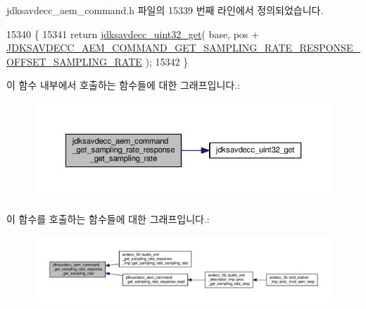 jdksavdecc\+\_\+aem\+\_\+command.\+h 파일의 15339 번째 라인에서 정의되었습니다.


\begin{DoxyCode}
15340 \{
15341     \textcolor{keywordflow}{return} \hyperlink{group__endian_gaefcf5bd4f368997a82f358ab89052d6b}{jdksavdecc\_uint32\_get}( base, pos + 
      \hyperlink{group__command__get__sampling__rate__response_ga8826ab43e3ef21d85d25e78ba00a0c52}{JDKSAVDECC\_AEM\_COMMAND\_GET\_SAMPLING\_RATE\_RESPONSE\_OFFSET\_SAMPLING\_RATE}
       );
15342 \}
\end{DoxyCode}


이 함수 내부에서 호출하는 함수들에 대한 그래프입니다.\+:
\nopagebreak
\begin{figure}[H]
\begin{center}
\leavevmode
\includegraphics[width=350pt]{group__command__get__sampling__rate__response_gaf5dc52b2c5bb5c247c7bbfca25466dd9_cgraph}
\end{center}
\end{figure}




이 함수를 호출하는 함수들에 대한 그래프입니다.\+:
\nopagebreak
\begin{figure}[H]
\begin{center}
\leavevmode
\includegraphics[width=350pt]{group__command__get__sampling__rate__response_gaf5dc52b2c5bb5c247c7bbfca25466dd9_icgraph}
\end{center}
\end{figure}


